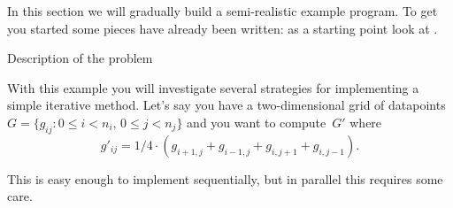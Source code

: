 
In this section we will gradually build a semi-realistic example
program. To get you started some pieces have already been written:
as a starting point look at .

 {Description of the problem}

With this example you will investigate several strategies for
implementing a simple iterative method. Let's say you have a
two-dimensional grid of datapoints $G=\{g_{ij}\colon 0\leq
i<n_i,\,0\leq j<n_j\}$ and you want to compute~$G'$ where
\begin{equation}
g'_{ij} = 1/4 \cdot (g_{i+1,j}+g_{i-1,j}+g_{i,j+1}+g_{i,j-1}).
\label{eq:grid-update}
\end{equation}

This is easy enough to implement sequentially, but in parallel this
requires some care.

